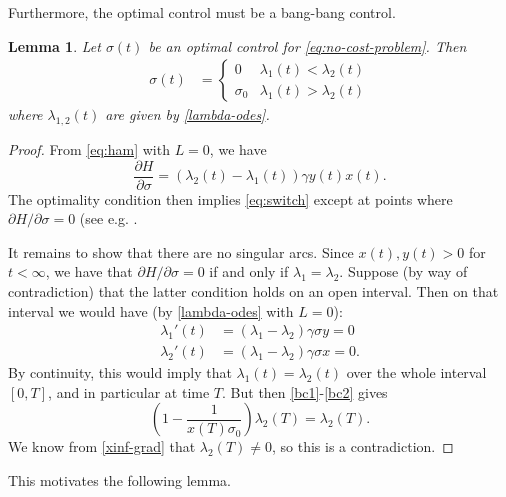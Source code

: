 \documentclass[english,12pt,letter]{article}
\newtheorem{lem}{Lemma}
\newcommand{\Rnot}{\sigma_0}
\begin{document}
Furthermore, the optimal control must be a bang-bang control.
\begin{lem} \label{lem:bang-bang}
Let $\sigma(t)$ be an optimal control for \eqref{eq:no-cost-problem}.
Then
\begin{align} \label{eq:switch}
    \sigma(t) & = \begin{cases} 0 & \lambda_1(t)<\lambda_2(t) \\ \sigma_0 & \lambda_1(t) > \lambda_2(t) \end{cases}
\end{align}
where $\lambda_{1,2}(t)$ are given by \eqref{lambda-odes}.
\end{lem}
\begin{proof}
From \eqref{eq:ham} with $L=0$, we have
$$
\frac{\partial H}{\partial \sigma} = (\lambda_2(t)-\lambda_1(t))\gamma y(t) x(t).
$$
The optimality condition then implies \eqref{eq:switch} except at points where $\partial H/\partial \sigma=0$
(see e.g. \cite[Ch. 17]{lenhart2007optimal}.

It remains to show that there are no singular arcs.
Since $x(t),y(t) >0$ for $t<\infty$, we have that $\partial H/\partial \sigma=0$
if and only if $\lambda_1=\lambda_2$.  Suppose (by way of contradiction) that
the latter condition holds on an open interval.  Then on that interval we would
have (by \eqref{lambda-odes} with $L=0$):
\begin{align}
\lambda_1'(t) & = (\lambda_1-\lambda_2)\gamma\sigma y = 0 \\
\lambda_2'(t) & = (\lambda_1-\lambda_2)\gamma\sigma x = 0.
\end{align}
By continuity, this would imply that $\lambda_1(t)=\lambda_2(t)$ over
the whole interval $[0,T]$, and in particular at time $T$.
But then \eqref{bc1}-\eqref{bc2} gives
$$
\left(1-\frac{1}{x(T)\Rnot}\right)\lambda_2(T) = \lambda_2(T).
$$
We know from \eqref{xinf-grad} that $\lambda_2(T)\ne 0$, so this
is a contradiction.
\end{proof}

This motivates the following lemma.
\end{document}
